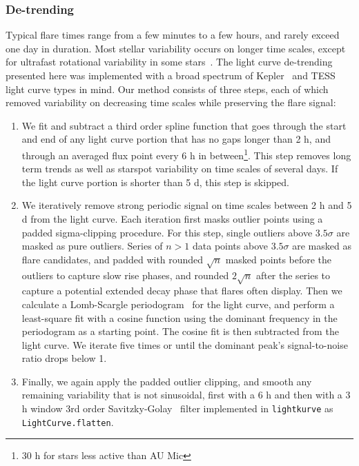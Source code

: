 \documentclass[fleqn,usenatbib]{mnras}%
\begin{document}
\subsubsection{De-trending}
\label{sec:detrend}
Typical flare times range from a few minutes to a few hours, and rarely exceed one day in duration. Most stellar variability occurs on longer time scales, except for ultrafast rotational variability in some stars~\citep{ilin2021giant}. The light curve de-trending presented here was implemented with a broad spectrum of Kepler~\citep{borucki2010} and TESS light curve types in mind. Our method consists of three steps, each of which removed variability on decreasing time scales while preserving the flare signal:  %

\begin{enumerate}
\item We fit and subtract a third order spline function that goes through the start and end of any light curve portion that has no gaps longer than 2 h, and through an averaged flux point every 6 h in between\footnote{30 h for stars less active than AU Mic}. This step removes long term trends as well as starspot variability on time scales of several days. If the light curve portion is shorter than 5 d, this step is skipped.
\item We iteratively remove strong periodic signal on time scales between 2 h and 5 d from the light curve. Each iteration first masks outlier points using a padded sigma-clipping procedure. For this step, single outliers above $3.5\sigma$ are masked as pure outliers. Series of $n>1$ data points above $3.5\sigma$ are masked as flare candidates, and padded with rounded $\sqrt{n}$ masked points before the outliers to capture slow rise phases, and rounded $2\sqrt{n}$ after the series to capture a potential extended decay phase that flares often display. Then we calculate a Lomb-Scargle periodogram~\citep{lomb1976,scargle1982} for the light curve, and perform a least-square fit with a cosine function using the dominant frequency in the periodogram as a starting point. The cosine fit is then subtracted from the light curve. We iterate five times or until the dominant peak's signal-to-noise ratio drops below 1.
\item Finally, we again apply the padded outlier clipping, and smooth any remaining variability that is not sinusoidal, first with a 6 h and then with a 3 h window 3rd order Savitzky-Golay~\citep{savitzky1964} filter implemented in \texttt{lightkurve} as \texttt{LightCurve.flatten}.
\end{enumerate}
\end{document}
